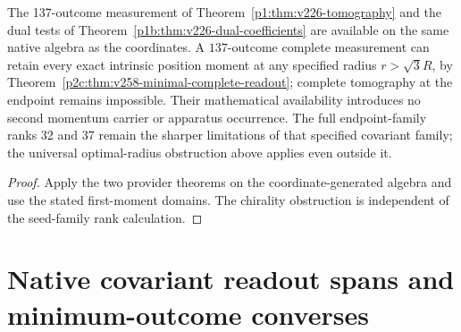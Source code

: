 \documentclass[12pt,a4paper]{article}
\begin{document}
\begin{corollary}
\label{p2c:cor:v226-complete-readout}
The 137-outcome measurement of Theorem~\ref{p1:thm:v226-tomography} and
the dual tests of Theorem~\ref{p1b:thm:v226-dual-coefficients} are available
on the same native algebra as the coordinates. A $137$-outcome complete measurement can retain every exact intrinsic
position moment at any specified radius $r>\sqrt3R$, by
Theorem~\ref{p2c:thm:v258-minimal-complete-readout}; complete tomography
at the endpoint remains impossible. Their mathematical
availability introduces no second momentum carrier or apparatus occurrence.
The full endpoint-family ranks 32 and 37 remain the sharper limitations of
that specified covariant family; the universal optimal-radius obstruction
above applies even outside it.
\end{corollary}
\begin{proof}
Apply the two provider theorems on the coordinate-generated algebra and
use the stated first-moment domains. The chirality obstruction is independent
of the seed-family rank calculation.
\end{proof}


\section{Native covariant readout spans and minimum-outcome converses}
\end{document}
